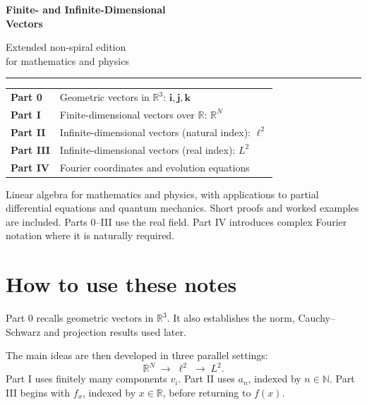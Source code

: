 \documentclass[11pt,a5paper,oneside,openany]{scrreprt}
\theoremstyle{notes}
\theoremstyle{definitions}
\newcommand{\R}{\mathbb{R}}
\newcommand{\N}{\mathbb{N}}
\newcommand{\PartMap}{\R^N\;\longrightarrow\;\ell^2\;\longrightarrow\;L^2}
\begin{document}
\begin{titlepage}
  \thispagestyle{empty}
  \vspace*{7mm}
  {\sffamily\bfseries\fontsize{20}{25}\selectfont
    Finite- and Infinite-Dimensional\\[1mm]Vectors\par}
  \vspace{3mm}
  {\sffamily\Large Extended non-spiral edition\\[1mm]
    for mathematics and physics\par}
  \vspace{8mm}
  \rule{\textwidth}{0.7pt}
  \vspace{5mm}
  {\normalsize
    \begin{tabular}{@{}>{\bfseries}p{}p{}@{}}
      Part 0 & Geometric vectors in $\R^3$: $\mathbf i,\mathbf j,\mathbf k$\\[1mm]
      Part I & Finite-dimensional vectors over $\R$: $\R^N$\\[1mm]
      Part II & Infinite-dimensional vectors (natural index): $\ell^2$\\[1mm]
      Part III & Infinite-dimensional vectors (real index): $L^2$\\[1mm]
      Part IV & Fourier coordinates and evolution equations
    \end{tabular}\par}
  \vspace{5mm}
\begin{summarybox}
    Linear algebra for mathematics and physics, with applications to partial
    differential equations and quantum mechanics. Short proofs and worked examples are included.
    Parts 0--III use the real field. Part IV introduces complex Fourier
    notation where it is naturally required.
\end{summarybox}
\end{titlepage}

\chapter*{How to use these notes}

Part 0 recalls geometric vectors in $\R^3$.  It also establishes the norm,
Cauchy--Schwarz and projection results used later.

The main ideas are then developed in three parallel settings:
\[
  \boxed{\PartMap}.
\]
Part I uses finitely many components $v_i$.  Part II uses $a_n$, indexed by
$n\in\N$.  Part III begins with $f_x$, indexed by $x\in\R$, before returning
to $f(x)$.
\end{document}
